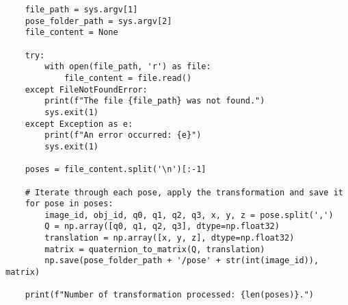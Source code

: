 \begin{lstlisting}
    file_path = sys.argv[1]
    pose_folder_path = sys.argv[2]
    file_content = None

    try:
        with open(file_path, 'r') as file:
            file_content = file.read()
    except FileNotFoundError:
        print(f"The file {file_path} was not found.")
        sys.exit(1)
    except Exception as e:
        print(f"An error occurred: {e}")
        sys.exit(1)

    poses = file_content.split('\n')[:-1]

    # Iterate through each pose, apply the transformation and save it
    for pose in poses:
        image_id, obj_id, q0, q1, q2, q3, x, y, z = pose.split(',')
        Q = np.array([q0, q1, q2, q3], dtype=np.float32)
        translation = np.array([x, y, z], dtype=np.float32)
        matrix = quaternion_to_matrix(Q, translation)
        np.save(pose_folder_path + '/pose' + str(int(image_id)), matrix)

    print(f"Number of transformation processed: {len(poses)}.")
\end{lstlisting}

\bigskip


